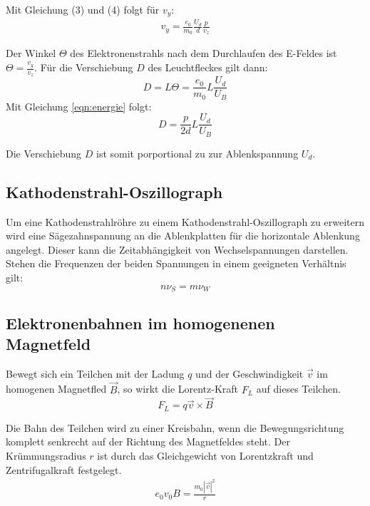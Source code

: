 Mit Gleichung (3) und (4) folgt für $v_y$:
\begin{align}
  v_y = \frac{e_0}{m_0} \frac{U_d}{d} \frac{p}{v_z}
\end{align}

Der Winkel $\Theta$ des Elektronenstrahls nach dem Durchlaufen des E-Feldes ist $\Theta = \frac{v_y}{v_z}$.
Für die Verschiebung $D$ des Leuchtfleckes gilt dann:
\begin{equation}
  D = L \Theta = \frac{e_0}{m_0} L \frac{U_d}{U_B}
\end{equation}
 Mit Gleichung \eqref{eqn:energie} folgt:
\begin{equation}
  D = \frac{p}{2d} L \frac{U_d}{U_B}
\end{equation}

Die Verschiebung $D$ ist somit porportional zu zur Ablenkspannung $U_d$.

\subsection{Kathodenstrahl-Oszillograph}

Um eine Kathodenstrahlröhre zu einem Kathodenstrahl-Oszillograph zu erweitern wird eine
Sägezahnspannung an die Ablenkplatten für die horizontale Ablenkung angelegt. Dieser
kann die Zeitabhängigkeit von Wechselspannungen darstellen.
Stehen die Frequenzen der beiden Spannungen in einem geeigneten Verhältnis gilt:
\begin{equation}
  n \nu_S = m \nu_W
\end{equation}


\subsection{Elektronenbahnen im homogenenen Magnetfeld}

Bewegt sich ein Teilchen mit der Ladung $q$ und der Geschwindigkeit $\vec{v}$ im homogenen Magnetfled $\vec{B}$, so
wirkt die Lorentz-Kraft $F_L$ auf dieses Teilchen.
\begin{equation}
  F_L = q \vec{v} \times \vec{B}
\end{equation}

Die Bahn des Teilchen wird zu einer Kreisbahn, wenn die Bewegungsrichtung komplett senkrecht auf der
Richtung des Magnetfeldes steht.
Der Krümmungsradius $r$ ist durch das Gleichgewicht von Lorentzkraft und Zentrifugalkraft festgelegt.
\begin{align}
  e_0 v_0 B = \frac{m_0 | \vec{v} |^2}{r}
\end{align}

